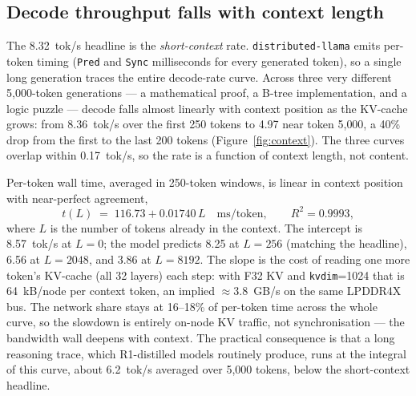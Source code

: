 \documentclass[10pt,a4paper]{article}
\begin{document}
\subsection{Decode throughput falls with context length}
\label{sec:context}
The 8.32~tok/s headline is the \emph{short-context} rate. \texttt{distributed-llama} emits per-token timing (\texttt{Pred} and \texttt{Sync} milliseconds for every generated token), so a single long generation traces the entire decode-rate curve. Across three very different 5{,}000-token generations --- a mathematical proof, a B-tree implementation, and a logic puzzle --- decode falls almost linearly with context position as the KV-cache grows: from 8.36~tok/s over the first 250 tokens to 4.97 near token 5{,}000, a 40\% drop from the first to the last 200 tokens (Figure~\ref{fig:context}). The three curves overlap within 0.17~tok/s, so the rate is a function of context length, not content.

Per-token wall time, averaged in 250-token windows, is linear in context position with near-perfect agreement,
\[
  t(L) \;=\; 116.73 + 0.01740\,L \quad\text{ms/token},\qquad R^2 = 0.9993,
\]
where $L$ is the number of tokens already in the context. The intercept is 8.57~tok/s at $L{=}0$; the model predicts 8.25 at $L{=}256$ (matching the headline), 6.56 at $L{=}2048$, and 3.86 at $L{=}8192$. The slope is the cost of reading one more token's KV-cache (all 32 layers) each step: with F32 KV and \texttt{kvdim}=1024 that is 64~kB/node per context token, an implied $\approx$3.8~GB/s on the same LPDDR4X bus. The network share stays at 16--18\% of per-token time across the whole curve, so the slowdown is entirely on-node KV traffic, not synchronisation --- the bandwidth wall deepens with context. The practical consequence is that a long reasoning trace, which R1-distilled models routinely produce, runs at the integral of this curve, about 6.2~tok/s averaged over 5{,}000 tokens, below the short-context headline.
\end{document}
